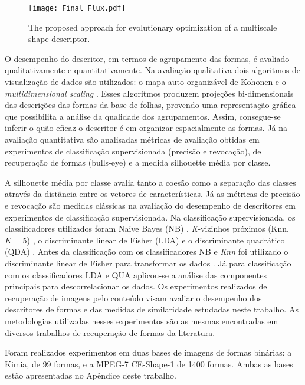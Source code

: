 \begin{figure*}
\centering
\texttt{[image: Final\_Flux.pdf]}
\caption{The proposed approach for evolutionary optimization of a multiscale shape descriptor.} 
\label{fig:Avaliacao}
\end{figure*}

O desempenho do descritor, em termos de agrupamento das formas, é avaliado qualitativamente e quantitativamente. Na avaliação qualitativa dois algoritmos de visualização de dados são utilizados: o mapa auto-organizável de Kohonen \cite{Kohonen:2001} e o \textit{multidimensional scaling} \cite{cox:2000}. Esses algoritmos produzem projeções bi-dimensionais das descrições das formas da base de folhas, provendo uma representação gráfica que possibilita a análise da qualidade dos agrupamentos. Assim, consegue-se inferir o quão eficaz o descritor é em organizar espacialmente as formas. Já na avaliação quantitativa são analisadas métricas de avaliação obtidas em experimentos de classificação supervisionada (precisão e revocação), de recuperação de formas (bulls-eye) e a medida silhouette \cite{Rousseeuw:1987} média por classe. 

A silhouette média por classe avalia tanto a coesão como a separação das classes através da distância entre os vetores de características. Já as métricas de precisão e revocação são medidas clássicas na avaliação do desempenho de descritores em experimentos de classificação supervisionada. Na classificação supervisionada, os classificadores utilizados foram Naive Bayes (NB) \cite{Fukunaga:1990}, \emph{K}-vizinhos próximos (Knn, $K = 5$) \cite{Fukunaga:1990,Webb:2002},  o discriminante linear de Fisher (LDA) \cite{Webb:2002} e o discriminante quadrático (QDA) \cite{Fukunaga:1990}.  Antes da classificação com os classificadores NB e \emph{Knn} foi utilizado o discriminante linear de Fisher para transformar os dados \cite{Webb:2002}. Já para classificação com os classificadores LDA e QUA aplicou-se a análise das componentes principais para descorrelacionar os dados. Os experimentos realizados de recuperação de imagens pelo conteúdo visam avaliar o desempenho dos descritores de formas e das medidas de similaridade estudadas neste trabalho. As metodologias utilizadas nesses experimentos são as mesmas encontradas em diversos trabalhos de recuperação de formas da literatura.

Foram realizados experimentos em duas bases de imagens de formas binárias: a Kimia, de 99 formas, e a MPEG-7 CE-Shape-1 de 1400 formas. Ambas as bases estão apresentadas no Apêndice deste trabalho.

